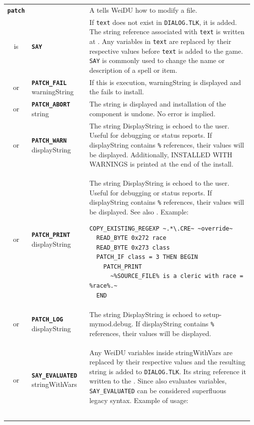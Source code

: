 \documentclass{article}
\def\ttref#1{\ahrefloc{#1}{\tt #1}}
\def\DEFINE#1{{\tt \bf #1}\label{#1}\index{#1}}
\def\DEFSYN#1{{\tt \bf #1}\index{#1}}
\def\t#1{{\tt #1}}
\begin{document}
\begin{tabular}{cp{10in}|p{10in}}
\DEFINE{patch}\label{TP2 Patch} & & A \ttref{patch} tells WeiDU how to modify a file.  \\
is & \DEFSYN{SAY} \ttref{offset} \ttref{text} &
  If \t{text} does not exist in \t{DIALOG.TLK}, it is added. The
  string reference associated with \t{text} is written at
  \ttref{offset}. Any variables in \t{text} are replaced by their
  respective values before \t{text} is added to the game. \t{SAY} is
  commonly used to change the name or description of a spell or
  item. \\
  or & \DEFINE{PATCH_FAIL} warningString &
    If this \ttref{TP2 Action} is execution, warningString is displayed and
    the \ttref{component} fails to install. \\
  or & \DEFINE{PATCH_ABORT} string &
    The string is displayed and installation of the component is undone.
    No error is implied. \\
  or & \DEFINE{PATCH_WARN} displayString &
    The string DisplayString is echoed to the user. Useful for debugging or
    status reports. If displayString contains \t{\%}\ttref{variable}\t{\%}
    references, their values will be displayed. Additionally, INSTALLED WITH
    WARNINGS is printed at the end of the install.
    \\
  or & \DEFINE{PATCH_PRINT} displayString &
  The string DisplayString is echoed to the user. Useful for debugging or
  status reports. If displayString contains \t{\%}\ttref{variable}\t{\%}
  references, their values will be displayed. See also \ttref{PRINT}.
  Example:
\begin{verbatim}
COPY_EXISTING_REGEXP ~.*\.CRE~ ~override~
  READ_BYTE 0x272 race
  READ_BYTE 0x273 class
  PATCH_IF class = 3 THEN BEGIN
    PATCH_PRINT
      ~%SOURCE_FILE% is a cleric with race = %race%.~
  END
\end{verbatim} \\
  or & \DEFINE{PATCH_LOG} displayString &
    The string DisplayString is echoed to setup-mymod.debug.
    If displayString contains \t{\%}\ttref{variable}\t{\%}
    references, their values will be displayed. \\
    or & \DEFINE{SAY_EVALUATED} \ttref{offset} stringWithVars &
  Any WeiDU variables inside stringWithVars are replaced by their
  respective values and the resulting string is added to
  \t{DIALOG.TLK}. Its string reference it written to the
  \ttref{offset}. Since \ttref{SAY} also evaluates variables,
  \t{SAY_EVALUATED} can be considered superfluous legacy
  syntax. Example of usage:
\begin{verbatim}

\end{verbatim}
\end{tabular}
\end{document}
